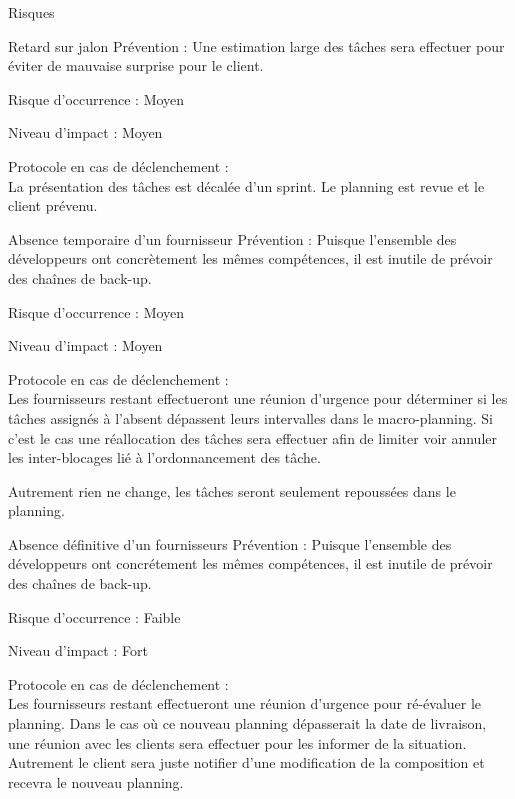 \documentclass[]{article}
\begin{document}
    \begin{section}{Risques}
        \begin{subsection}{Retard sur jalon}
            Prévention : Une estimation large des tâches sera effectuer pour éviter de mauvaise surprise pour le
            client.

            Risque d’occurrence : Moyen

            Niveau d’impact : Moyen

            Protocole en cas de déclenchement :\\
            La présentation des tâches est décalée d’un sprint. Le planning est revue et le client prévenu.
        \end{subsection}

        \begin{subsection}{Absence temporaire d’un fournisseur}
            Prévention : Puisque l’ensemble des développeurs ont concrètement les mêmes compétences, il est
            inutile de prévoir des chaînes de back-up.

            Risque d’occurrence : Moyen

            Niveau d’impact : Moyen

            Protocole en cas de déclenchement :\\
            Les fournisseurs restant effectueront une réunion d’urgence pour déterminer si les tâches assignés à
            l’absent dépassent leurs intervalles dans le macro-planning. Si c’est le cas une réallocation des
            tâches sera effectuer afin de limiter voir annuler les inter-blocages lié à l’ordonnancement des tâche.

            Autrement rien ne change, les tâches seront seulement repoussées dans le planning.
        \end{subsection}

        \begin{subsection}{Absence définitive d’un fournisseurs}
            Prévention : Puisque l’ensemble des développeurs ont concrétement les mêmes compétences, il est
            inutile de prévoir des chaînes de back-up.

            Risque d’occurrence : Faible

            Niveau d’impact : Fort

            Protocole en cas de déclenchement :\\
            Les fournisseurs restant effectueront une réunion d’urgence pour ré-évaluer le planning. Dans le cas
            où ce nouveau planning dépasserait la date de livraison, une réunion avec les clients sera effectuer
            pour les informer de la situation. Autrement le client sera juste notifier d’une modification de la
            composition et recevra le nouveau planning.
        \end{subsection}


\end{section}
\end{document}
